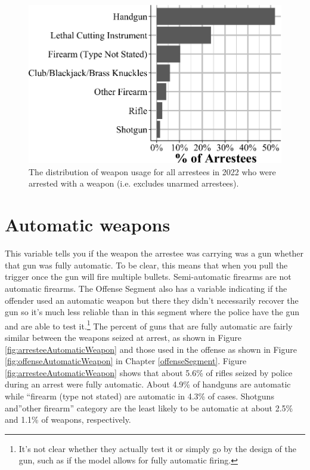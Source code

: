 \documentclass[
  12pt,
  openany]{book}
\begin{document}
\begin{figure}

{\centering \includegraphics[width=0.9\linewidth]{16_nibrs_arrestee_files/figure-latex/arresteeWeaponArmed-1} 

}

\caption{The distribution of weapon usage for all arrestees in 2022 who were arrested with a weapon (i.e. excludes unarmed arrestees).}\label{fig:arresteeWeaponArmed}
\end{figure}

\section{Automatic weapons}\label{automatic-weapons-1}

This variable tells you if the weapon the arrestee was carrying was a gun whether that gun was fully automatic. To be clear, this means that when you pull the trigger once the gun will fire multiple bullets. Semi-automatic firearms are not automatic firearms. The Offense Segment also has a variable indicating if the offender used an automatic weapon but there they didn't necessarily recover the gun so it's much less reliable than in this segment where the police have the gun and are able to test it.\footnote{It's not clear whether they actually test it or simply go by the design of the gun, such as if the model allows for fully automatic firing.} The percent of guns that are fully automatic are fairly similar between the weapons seized at arrest, as shown in Figure \ref{fig:arresteeAutomaticWeapon} and those used in the offense as shown in Figure \ref{fig:offenseAutomaticWeapon} in Chapter \ref{offenseSegment}. Figure \ref{fig:arresteeAutomaticWeapon} shows that about 5.6\% of rifles seized by police during an arrest were fully automatic. About 4.9\% of handguns are automatic while ``firearm (type not stated) are automatic in 4.3\% of cases. Shotguns and''other firearm'' category are the least likely to be automatic at about 2.5\% and 1.1\% of weapons, respectively.
\end{document}
